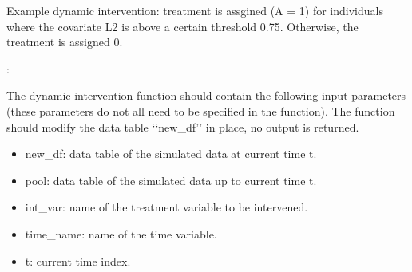 \documentclass[letterpaper,10pt,english]{sphinxmanual}
\begin{document}
\sphinxAtStartPar
Example dynamic intervention: treatment is assgined (A = 1) for individuals where the covariate L2 is above a certain threshold 0.75.
Otherwise, the treatment is assigned 0.

\sphinxAtStartPar
{}:

\begin{sphinxVerbatim}[commandchars=\\\{\}]
     
    \PYG{p}{[}\PYG{p}{[}\PYG{p}{]}   \PYG{p}{]}  
    \PYG{p}{[}\PYG{p}{[}\PYG{p}{]}   \PYG{p}{]}  

  \PYG{p}{[}\PYG{p}{]}
  \PYG{p}{[}\PYG{p}{]}

     
                        \PYG{p}{[}\PYG{p}{]} 
\end{sphinxVerbatim}

\sphinxAtStartPar
The dynamic intervention function should contain the following input parameters (these parameters do not all need to be specified in the function).
The function should modify the data table ‘‘new\_df’’ in place, no output is returned.
\begin{itemize}
\item {} 
\sphinxAtStartPar
new\_df: data table of the simulated data at current time t.

\item {} 
\sphinxAtStartPar
pool: data table of the simulated data up to current time t.

\item {} 
\sphinxAtStartPar
int\_var: name of the treatment variable to be intervened.

\item {} 
\sphinxAtStartPar
time\_name: name of the time variable.

\item {} 
\sphinxAtStartPar
t: current time index.

\end{itemize}
\end{document}
